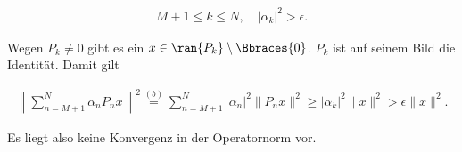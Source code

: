 \begin{solution}
\begin{align*}
  M+1 \leq k \leq N,
  \quad
  |\alpha_k|^2 > \epsilon.
\end{align*}

Wegen $P_k \neq 0$ gibt es ein $x \in \ran{P_k} \setminus \Bbraces{0}$.
$P_k$ ist auf seinem Bild die Identität.
Damit gilt

\begin{align}
 \left\| \sum_{n = M+1}^N \alpha_n P_n x \right\|^2
 \stackrel{(b)}{=}
 \sum_{n = M+1}^N | \alpha_n|^2 \| P_n x \|^2 \geq |\alpha_k|^2 \|x\|^2 > \epsilon \|x\|^2.
\end{align}

Es liegt also keine Konvergenz in der Operatornorm vor. \\

\end{solution}
